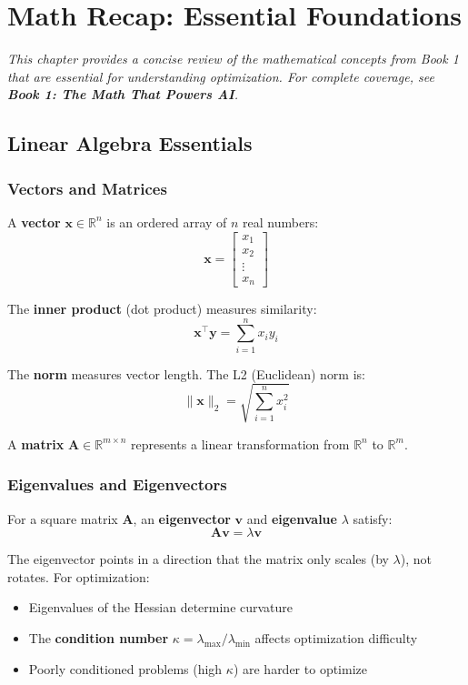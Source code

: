 \documentclass[../main.tex]{subfiles}
\begin{document}
\chapter*{Math Recap: Essential Foundations}

\textit{This chapter provides a concise review of the mathematical concepts from Book 1 that are essential for understanding optimization. For complete coverage, see \textbf{Book 1: The Math That Powers AI}.}

\section*{Linear Algebra Essentials}

\subsection*{Vectors and Matrices}

A \textbf{vector} $\mathbf{x} \in \mathbb{R}^n$ is an ordered array of $n$ real numbers:
\[
\mathbf{x} = \begin{bmatrix} x_1 \\ x_2 \\ \vdots \\ x_n \end{bmatrix}
\]

The \textbf{inner product} (dot product) measures similarity:
\[
\mathbf{x}^\top \mathbf{y} = \sum_{i=1}^{n} x_i y_i
\]

The \textbf{norm} measures vector length. The L2 (Euclidean) norm is:
\[
\|\mathbf{x}\|_2 = \sqrt{\sum_{i=1}^{n} x_i^2}
\]

A \textbf{matrix} $\mathbf{A} \in \mathbb{R}^{m \times n}$ represents a linear transformation from $\mathbb{R}^n$ to $\mathbb{R}^m$.

\subsection*{Eigenvalues and Eigenvectors}

For a square matrix $\mathbf{A}$, an \textbf{eigenvector} $\mathbf{v}$ and \textbf{eigenvalue} $\lambda$ satisfy:
\[
\mathbf{A}\mathbf{v} = \lambda\mathbf{v}
\]

The eigenvector points in a direction that the matrix only scales (by $\lambda$), not rotates. For optimization:
\begin{itemize}
    \item Eigenvalues of the Hessian determine curvature
    \item The \textbf{condition number} $\kappa = \lambda_{\max}/\lambda_{\min}$ affects optimization difficulty
    \item Poorly conditioned problems (high $\kappa$) are harder to optimize
\end{itemize}
\end{document}
